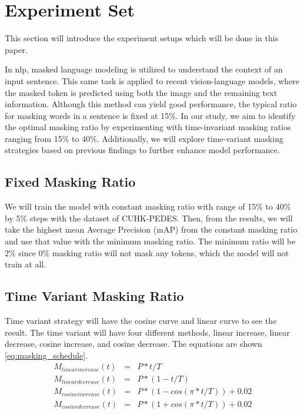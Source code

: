 \section{Experiment Set}
This section will introduce the experiment setups which will be done in this paper.

In \acrshort{nlp}, masked language modeling is utilized to understand the context of an input sentence. This same task is applied to recent vision-language models, where the masked token is predicted using both the image and the remaining text information. Although this method can yield good performance, the typical ratio for masking words in a sentence is fixed at 15\%. 
In our study, we aim to identify the optimal masking ratio by experimenting with time-invariant masking ratios ranging from 15\% to 40\%. Additionally, we will explore time-variant masking strategies based on previous findings to further enhance model performance.

\subsection{Fixed Masking Ratio}
We will train the model with constant masking ratio with range of 15\% to 40\% by 5\% steps with the dataset of CUHK-PEDES. Then, from the results, we will take the highest mean Average Precision (mAP) from the constant masking ratio and use that value with the minimum masking ratio. The minimum ratio will be 2\% since 0\% masking ratio will not mask any tokens, which the model will not train at all. 


\subsection{Time Variant Masking Ratio}
Time variant strategy will have the cosine curve and linear curve to see the result. The time variant will have four different methods, linear increase, linear decrease, cosine increase, and cosine decrease. The equations are shown \ref{eq:masking_schedule}. 
\begin{eqnarray}
M_{linear increase}\left( t \right) &=& P*t/T \\
M_{linear decrease}\left( t \right) &=& P*\left(1-t/T\right) \\
M_{cosine increase}\left(t\right) &=& P*\left(1-cos\left(\pi*t/T\right)\right) + 0.02 \\
M_{cosine decrease}\left(t\right) &=& P*\left(1+cos\left(\pi*t/T\right)\right) + 0.02 
\label{eq:masking_schedule}
\end{eqnarray}

